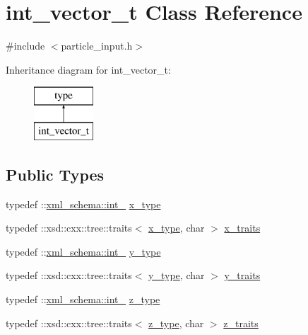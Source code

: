 \hypertarget{classint__vector__t}{}\section{int\+\_\+vector\+\_\+t Class Reference}
\label{classint__vector__t}


{\ttfamily \#include $<$particle\+\_\+input.\+h$>$}

Inheritance diagram for int\+\_\+vector\+\_\+t\+:\begin{figure}[H]
\begin{center}
\leavevmode
\includegraphics[height=2.000000cm]{classint__vector__t}
\end{center}
\end{figure}
\subsection*{Public Types}
\begin{DoxyCompactItemize}
\item 
typedef \+::\hyperlink{namespacexml__schema_acfa24ac68e1a188e7f44c36f7a158bf4}{xml\+\_\+schema\+::int\+\_\+} \hyperlink{classint__vector__t_a707ce51b5d31dcba928e26f41fa36cfa}{x\+\_\+type}
\item 
typedef \+::xsd\+::cxx\+::tree\+::traits$<$ \hyperlink{classint__vector__t_a707ce51b5d31dcba928e26f41fa36cfa}{x\+\_\+type}, char $>$ \hyperlink{classint__vector__t_a43010f516b3ee7806207d1234253c680}{x\+\_\+traits}
\item 
typedef \+::\hyperlink{namespacexml__schema_acfa24ac68e1a188e7f44c36f7a158bf4}{xml\+\_\+schema\+::int\+\_\+} \hyperlink{classint__vector__t_a7aa2a9276bdee3fad0e216343485a844}{y\+\_\+type}
\item 
typedef \+::xsd\+::cxx\+::tree\+::traits$<$ \hyperlink{classint__vector__t_a7aa2a9276bdee3fad0e216343485a844}{y\+\_\+type}, char $>$ \hyperlink{classint__vector__t_a2575b8ba0507d56caa435e393853e0ff}{y\+\_\+traits}
\item 
typedef \+::\hyperlink{namespacexml__schema_acfa24ac68e1a188e7f44c36f7a158bf4}{xml\+\_\+schema\+::int\+\_\+} \hyperlink{classint__vector__t_a20a60edf9f56f9455dc62b4e5f547bc3}{z\+\_\+type}
\item 
typedef \+::xsd\+::cxx\+::tree\+::traits$<$ \hyperlink{classint__vector__t_a20a60edf9f56f9455dc62b4e5f547bc3}{z\+\_\+type}, char $>$ \hyperlink{classint__vector__t_a867c91a38d505be5f9a8c1a72e4e48ba}{z\+\_\+traits}
\end{DoxyCompactItemize}
